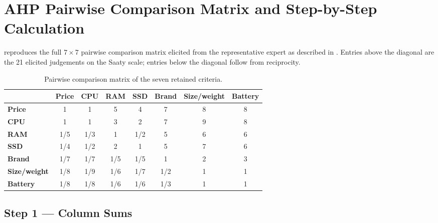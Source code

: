 \chapter{AHP Pairwise Comparison Matrix and Step-by-Step Calculation}\label{app:ahp-matrices}

 reproduces the full $7 \times 7$ pairwise comparison matrix elicited
from the representative expert as described in . Entries above the
diagonal are the 21 elicited judgements on the Saaty scale; entries below the diagonal
follow from reciprocity.

\begin{table}[htbp]
  \centering
  \caption{Pairwise comparison matrix of the seven retained criteria.}
  \label{tab:pcm-full}
  \begin{tabular}{@{}lccccccc@{}}
    \toprule
     & \textbf{Price} & \textbf{CPU} & \textbf{RAM} & \textbf{SSD} & \textbf{Brand} & \textbf{Size/weight} & \textbf{Battery} \\
    \midrule
    \textbf{Price}       & 1    & 1    & 5    & 4    & 7    & 8    & 8 \\
    \textbf{CPU}         & 1    & 1    & 3    & 2    & 7    & 9    & 8 \\
    \textbf{RAM}         & 1/5  & 1/3  & 1    & 1/2  & 5    & 6    & 6 \\
    \textbf{SSD}         & 1/4  & 1/2  & 2    & 1    & 5    & 7    & 6 \\
    \textbf{Brand}       & 1/7  & 1/7  & 1/5  & 1/5  & 1    & 2    & 3 \\
    \textbf{Size/weight} & 1/8  & 1/9  & 1/6  & 1/7  & 1/2  & 1    & 1 \\
    \textbf{Battery}     & 1/8  & 1/8  & 1/6  & 1/6  & 1/3  & 1    & 1 \\
    \bottomrule
  \end{tabular}
\end{table}

\section{Step 1 --- Column Sums}\label{app:ahp-step1}

